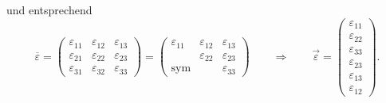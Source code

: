 und entsprechend
\[
\overline{\varepsilon}
=
\begin{pmatrix}
	\varepsilon_{11} & \varepsilon_{12} & \varepsilon_{13} \\ 
	\varepsilon_{21} & \varepsilon_{22} & \varepsilon_{23} \\
	\varepsilon_{31} & \varepsilon_{32} & \varepsilon_{33}
\end{pmatrix}
=
\begin{pmatrix}
	\varepsilon_{11} & \varepsilon_{12} & \varepsilon_{13} \\ 
	                 & \varepsilon_{22} & \varepsilon_{23} \\
	\text{sym}       &                  & \varepsilon_{33}
\end{pmatrix}
\qquad
\Rightarrow
\qquad
\vec{\varepsilon}
=
\begin{pmatrix}
	\varepsilon_{11} \\
	\varepsilon_{22} \\
	\varepsilon_{33} \\
	\varepsilon_{23} \\
	\varepsilon_{13} \\
	\varepsilon_{12}
\end{pmatrix}
.
\]

